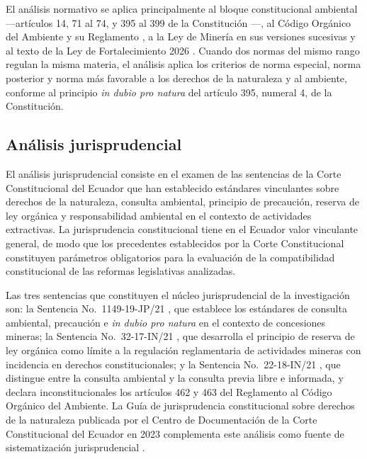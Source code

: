 El análisis normativo se aplica principalmente al bloque constitucional ambiental ---artículos 14, 71 al 74, y 395 al 399 de la Constitución \parencite{cre_2008}---, al Código Orgánico del Ambiente \parencite{coa_2017} y su Reglamento \parencite{reglamento_coa_2019}, a la Ley de Minería en sus versiones sucesivas \parencite{ley_mineria_2025} y al texto de la Ley de Fortalecimiento 2026 \parencite{ley_fortalecimiento_2026}. Cuando dos normas del mismo rango regulan la misma materia, el análisis aplica los criterios de norma especial, norma posterior y norma más favorable a los derechos de la naturaleza y al ambiente, conforme al principio \textit{in dubio pro natura} del artículo 395, numeral 4, de la Constitución.

\subsection{Análisis jurisprudencial}

El análisis jurisprudencial consiste en el examen de las sentencias de la Corte Constitucional del Ecuador que han establecido estándares vinculantes sobre derechos de la naturaleza, consulta ambiental, principio de precaución, reserva de ley orgánica y responsabilidad ambiental en el contexto de actividades extractivas. La jurisprudencia constitucional tiene en el Ecuador valor vinculante general, de modo que los precedentes establecidos por la Corte Constitucional constituyen parámetros obligatorios para la evaluación de la compatibilidad constitucional de las reformas legislativas analizadas.

Las tres sentencias que constituyen el núcleo jurisprudencial de la investigación son: la Sentencia No.\ 1149-19-JP/21 \parencite{cce_1149_19_jp_21}, que establece los estándares de consulta ambiental, precaución e \textit{in dubio pro natura} en el contexto de concesiones mineras; la Sentencia No.\ 32-17-IN/21 \parencite{cce_32_17_in_21}, que desarrolla el principio de reserva de ley orgánica como límite a la regulación reglamentaria de actividades mineras con incidencia en derechos constitucionales; y la Sentencia No.\ 22-18-IN/21 \parencite{cce_22_18_in_21}, que distingue entre la consulta ambiental y la consulta previa libre e informada, y declara inconstitucionales los artículos 462 y 463 del Reglamento al Código Orgánico del Ambiente. La Guía de jurisprudencia constitucional sobre derechos de la naturaleza publicada por el Centro de Documentación de la Corte Constitucional del Ecuador en 2023 complementa este análisis como fuente de sistematización jurisprudencial \parencite{cedec_guia_2023}.

